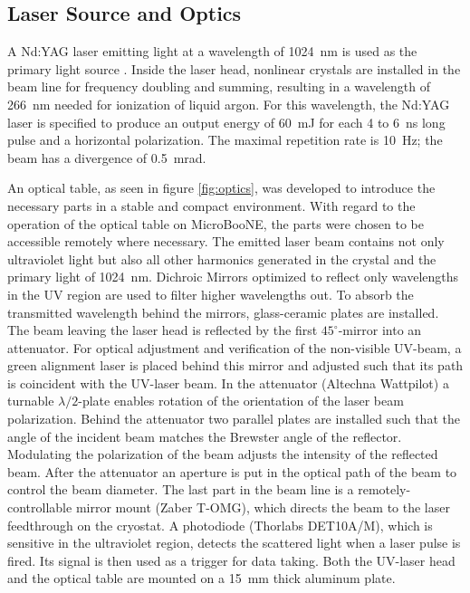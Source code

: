 \subsection{Laser Source and Optics}
A Nd:YAG laser emitting light at a wavelength of 1024~nm is used as the primary light source \cite{Continuum}. Inside the laser head, nonlinear crystals are installed in the beam line for frequency doubling and summing, resulting in a wavelength of 266~nm needed for ionization of liquid argon. For this wavelength, the Nd:YAG laser is specified to produce an output energy of 60~mJ for each 4 to 6~ns long pulse and a horizontal polarization. The maximal repetition rate is 10~Hz; the beam has a divergence of 0.5~mrad.

An optical table, as seen in figure \ref{fig:optics}, was developed to introduce the necessary parts in a stable and compact environment. With regard to the operation of the optical table on MicroBooNE, the parts were chosen to be accessible remotely where necessary. The emitted laser beam contains not only ultraviolet light but also all other harmonics generated in the crystal and the primary light of 1024~nm. Dichroic Mirrors optimized to reflect only wavelengths in the UV region are used to filter higher wavelengths out. To absorb the transmitted wavelength behind the mirrors, glass-ceramic plates are installed. The beam leaving the laser head is reflected by the first $45^{\circ}$-mirror into an attenuator. For optical adjustment and verification of the non-visible UV-beam, a green alignment laser is placed behind this mirror and adjusted such that its path is coincident with the UV-laser beam. In the attenuator (Altechna Wattpilot) a turnable $\lambda/2$-plate enables rotation of the orientation of the laser beam polarization. Behind the attenuator two parallel plates are installed such that the angle of the incident beam matches the Brewster angle of the reflector. Modulating the polarization of the beam adjusts the intensity of the reflected beam. After the attenuator an aperture is put in the optical path of the beam to control the beam diameter. The last part in the beam line is a remotely-controllable mirror mount (Zaber T-OMG), which directs the beam to the laser feedthrough on the cryostat. A photodiode (Thorlabs DET10A/M), which is sensitive in the ultraviolet region, detects the scattered light when a laser pulse is fired.  Its signal is then used as a trigger for data taking. Both the UV-laser head and the optical table are mounted on a 15~mm thick aluminum plate.

